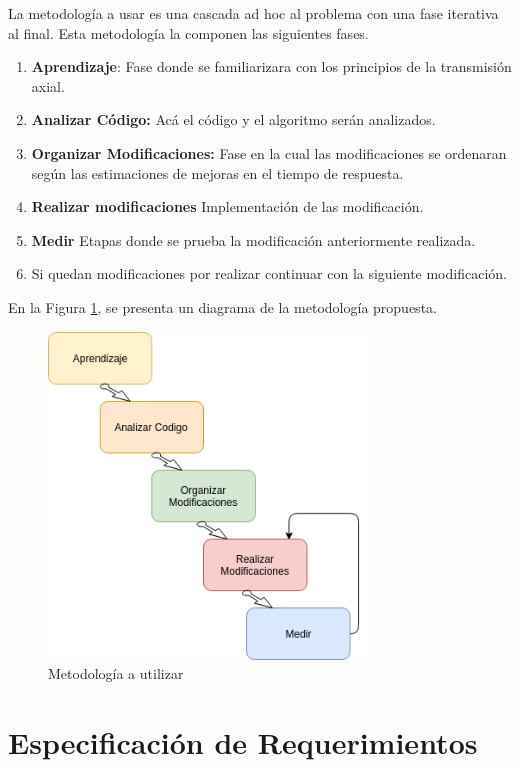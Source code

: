 La metodología a usar es una cascada ad hoc al problema con una fase iterativa al final.
Esta metodología la componen las siguientes fases.
\begin{enumerate}
    \item \textbf{Aprendizaje}: Fase donde se familiarizara con los principios de la transmisión axial.
    \item \textbf{Analizar Código:} Acá el código y el algoritmo serán analizados.
    \item \textbf{Organizar Modificaciones:} Fase en la cual las modificaciones se ordenaran según las estimaciones de mejoras en el tiempo de respuesta.
    \item \textbf{Realizar modificaciones} Implementación de las modificación.
    \item \textbf{Medir} Etapas donde se prueba la modificación anteriormente realizada.
    \item Si quedan modificaciones por realizar continuar con la siguiente modificación.
\end{enumerate}


En la Figura \ref{fig:met}, se presenta un diagrama de la metodología propuesta.

\begin{figure}[H]
    \centering
    \includegraphics[width=0.75\textwidth]{imagenes/metod.png}
    \caption{Metodología a utilizar}
    \label{fig:met}
\end{figure}

\section{Especificación de Requerimientos}
\label{sc:ER}

